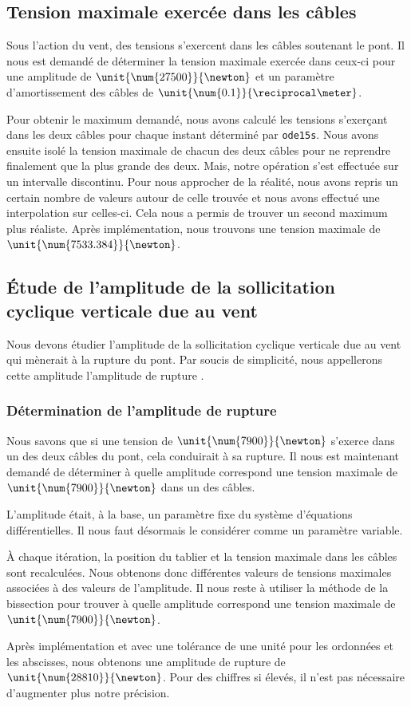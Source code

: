 \documentclass[a4paper, 12pt]{article}
\begin{document}
	\subsection{Tension maximale exercée dans les câbles}
	Sous l'action du vent, des tensions s'exercent dans les câbles soutenant le pont. Il nous est demandé de déterminer la tension maximale exercée dans ceux-ci pour une amplitude de $\unit{\num{27500}}{\newton}$ et un paramètre d'amortissement des câbles de $\unit{\num{0.1}}{\reciprocal\meter}$.\par
	Pour obtenir le maximum demandé, nous avons calculé les tensions s'exerçant dans les deux câbles pour chaque instant déterminé par \texttt{ode15s}. Nous avons ensuite isolé la tension maximale de chacun des deux câbles pour ne reprendre finalement que la plus grande des deux. Mais, notre opération s'est effectuée sur un intervalle discontinu. Pour nous approcher de la réalité, nous avons repris un certain nombre de valeurs autour de celle trouvée et nous avons effectué une interpolation sur celles-ci. Cela nous a permis de trouver un second maximum plus réaliste.
	Après implémentation, nous trouvons une tension maximale de $\unit{\num{7533.384}}{\newton}$.
	\subsection{Étude de l'amplitude de la sollicitation cyclique verticale due au vent}
	Nous devons étudier l’amplitude de la sollicitation cyclique verticale due au vent qui mènerait à la rupture du pont. Par soucis de simplicité, nous appellerons cette amplitude \og l'amplitude de rupture \fg{}.
	\subsubsection{Détermination de l'amplitude de rupture}
	Nous savons que si une tension de $\unit{\num{7900}}{\newton}$ s'exerce dans un des deux câbles du pont, cela conduirait à sa rupture. Il nous est maintenant demandé de déterminer à quelle amplitude correspond une tension maximale de $\unit{\num{7900}}{\newton}$ dans un des câbles.\par
	L'amplitude était, à la base, un paramètre fixe du système d'équations différentielles. Il nous faut désormais le considérer comme un paramètre variable.\par À chaque itération, la position du tablier et la tension maximale dans les câbles sont recalculées. Nous obtenons donc différentes valeurs de tensions maximales associées à des valeurs de l'amplitude. Il nous reste à utiliser la méthode de la bissection pour trouver à quelle amplitude correspond une tension maximale de $\unit{\num{7900}}{\newton}$.\par
	Après implémentation et avec une tolérance de une unité pour les ordonnées et les abscisses, nous obtenons une amplitude de rupture de $\unit{\num{28810}}{\newton}$. Pour des chiffres si élevés, il n'est pas nécessaire d'augmenter plus notre précision.
\end{document}
